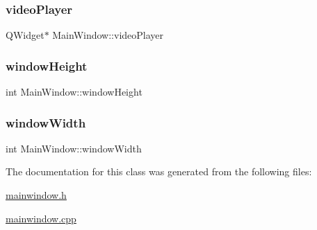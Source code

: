 \mbox{\label{class_main_window_a3adf86de532933a431d3c455ca69ead2}} 
\subsubsection{\texorpdfstring{video\+Player}{videoPlayer}}
{\footnotesize\ttfamily Q\+Widget$\ast$ Main\+Window\+::video\+Player}

\mbox{\label{class_main_window_a7bc7703ecfb3fbf19c202e37cbd21478}} 
\subsubsection{\texorpdfstring{window\+Height}{windowHeight}}
{\footnotesize\ttfamily int Main\+Window\+::window\+Height}

\mbox{\label{class_main_window_aea07048eb175eb5ba13887bb5fb23d3e}} 
\subsubsection{\texorpdfstring{window\+Width}{windowWidth}}
{\footnotesize\ttfamily int Main\+Window\+::window\+Width}



The documentation for this class was generated from the following files\+:\begin{DoxyCompactItemize}
\item 
\mbox{\hyperlink{mainwindow_8h}{mainwindow.\+h}}\item 
\mbox{\hyperlink{mainwindow_8cpp}{mainwindow.\+cpp}}\end{DoxyCompactItemize}

